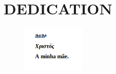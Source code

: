 \chapter*{DEDICATION}\thispagestyle{headings}
\begin{flushright}
  \itshape
  \begin{figure}[h]
          \flushright
            \includegraphics[width=0.27\textwidth]{figures/dedication.png}
            \label{fig:dedication}
    \end{figure}
\end{flushright}
